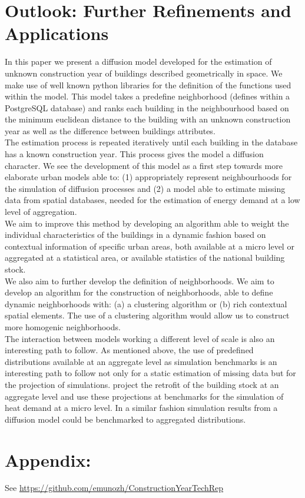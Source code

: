 \section{Outlook: Further Refinements and Applications}

In this paper we present a diffusion model developed for the estimation of
unknown construction year of buildings described geometrically in space. We
make use of well known python libraries for the definition of the functions
used within the model. This model takes a predefine neighborhood (defines
within a PostgreSQL database) and ranks each building in the neighbourhood
based on the minimum euclidean distance to the building with an unknown
construction year as well as the difference between buildings attributes.\\

The estimation process is repeated iteratively until each building in the
database has a known construction year. This process gives the model a
diffusion character. We see the development of this model as a first step
towards more elaborate urban models able to: (1) appropriately represent
neighbourhoods for the simulation of diffusion processes and (2) a model able
to estimate missing data from spatial databases, needed for the estimation of
energy demand at a low level of aggregation.\\

We aim to improve this method by developing an algorithm able to weight the
individual characteristics of the buildings in a dynamic fashion based on
contextual information of specific urban areas, both available at a micro level
or aggregated at a statistical area, or available statistics of the national
building stock.\\

We also aim to further develop the definition of neighborhoods. We aim to
develop an algorithm for the construction of neighborhoods, able to define
dynamic neighborhoods with: (a) a clustering algorithm or (b) rich contextual
spatial elements. The use of a clustering algorithm would allow us to construct
more homogenic neighborhoods.\\

The interaction between models working a different level of scale is also an
interesting path to follow. As mentioned above, the use of predefined
distributions available at an aggregate level as simulation benchmarks is an
interesting path to follow not only for a static estimation of missing data but
for the projection of simulations. \citet{MunozH.2015.IBPSA.Pop} project the
retrofit of the building stock at an aggregate level and use these projections
at benchmarks for the simulation of heat demand at a micro level. In a similar
fashion simulation results from a diffusion model could be benchmarked to
aggregated distributions.\\

\section{Appendix:}
 
See \url{https://github.com/emunozh/ConstructionYearTechRep}
